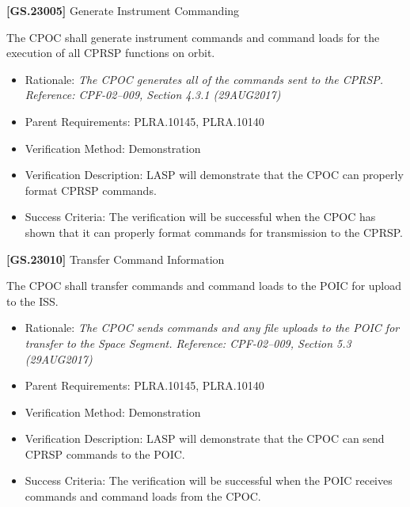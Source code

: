\label{tbx_1}

\textbf{[GS.23005]} Generate Instrument Commanding

The \gls{CPOC} shall generate instrument commands and command loads for the execution of all \gls{CPRSP} functions on orbit.

\begin{itemize}
\item{} Rationale: \emph{The CPOC generates all of the commands sent to the CPRSP. Reference: CPF-02--009, Section 4.3.1 (29AUG2017)}

\item{} Parent Requirements: PLRA.10145, PLRA.10140

\item{} Verification Method: Demonstration

\item{} Verification Description: \gls{LASP} will demonstrate that the \gls{CPOC} can properly format \gls{CPRSP} commands.

\item{} Success Criteria: The verification will be successful when the \gls{CPOC} has shown that it can properly format commands for transmission to the \gls{CPRSP}.

\end{itemize}

\textbf{[GS.23010]} Transfer Command Information

The \gls{CPOC} shall transfer commands and command loads to the \gls{POIC} for upload to the \gls{ISS}.

\begin{itemize}
\item{} Rationale: \emph{The CPOC sends commands and any file uploads to the POIC for transfer to the Space Segment. Reference: CPF-02--009, Section 5.3 (29AUG2017)}

\item{} Parent Requirements: PLRA.10145, PLRA.10140

\item{} Verification Method: Demonstration

\item{} Verification Description: \gls{LASP} will demonstrate that the \gls{CPOC} can send \gls{CPRSP} commands to the \gls{POIC}.

\item{} Success Criteria: The verification will be successful when the \gls{POIC} receives commands and command loads from the \gls{CPOC}.

\end{itemize}

